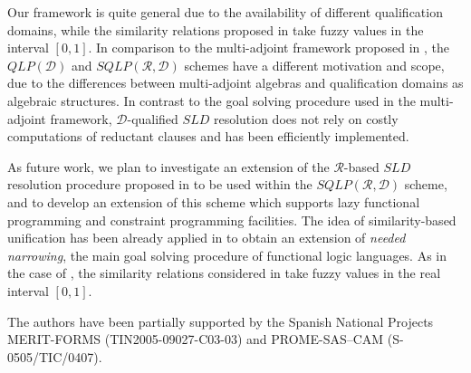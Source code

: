 \documentclass{sigplanconf}
\newcommand{\qdom}{\mathcal{D}} \newcommand{\dqdom}{D \setminus \{\bot\}} \newcommand{\bqdom}{(D \setminus \{\bot\}) \uplus \{?\}}
\newcommand{\simrel}{\mathcal{R}}
\newcommand{\qlp}[1]{QLP({#1})} \newcommand{\slp}[2]{SLP({#1,#2})} \newcommand{\sqlp}[2]{SQLP({#1,#2})} \newcommand{\bqlp}[1]{BQLP({#1})} \newcommand{\clp}[1]{CLP({#1})}
\theoremstyle{definition}
\theoremstyle{plain}
\begin{document}
Our framework is quite general due to the availability of different qualification domains, while the similarity relations proposed in \cite{Ses02} take fuzzy values in the interval $[0,1]$. In comparison to the multi-adjoint framework proposed in \cite{MOV04}, the $\qlp{\qdom}$ and $\sqlp{\simrel}{\qdom}$ schemes have a different motivation and scope, due to the differences between multi-adjoint algebras and qualification domains as algebraic structures. In contrast to the goal solving procedure used in the multi-adjoint framework, $\qdom$-qualified $SLD$ resolution does not
rely on costly computations of reductant clauses and has been efficiently implemented.

As future work, we plan to investigate an extension of the $\simrel$-based $SLD$ resolution procedure proposed in \cite{Ses02} to be used within the $\sqlp{\simrel}{\qdom}$ scheme, and to develop an extension of this scheme which supports lazy functional programming and constraint programming facilities. The idea of  similarity-based unification has been already applied in \cite{MP06a} to obtain an extension of {\em needed narrowing}, the main goal solving procedure of functional logic languages. As in the case of \cite{Ses02}, the similarity relations considered in \cite{MP06a} take fuzzy values in the real interval $[0,1]$.

\acks
The authors have been partially supported by the Spanish National Projects MERIT-FORMS (TIN2005-09027-C03-03) and PROME-SAS--CAM (S-0505/TIC/0407).
\end{document}
